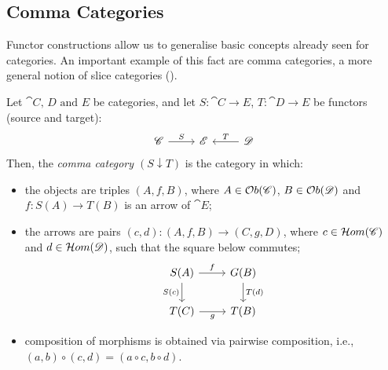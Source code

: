 \subsection{Comma Categories}

Functor constructions allow us to generalise basic concepts already seen for categories. An important example of this fact are comma categories, a more general notion of slice categories ().


\begin{definition}\label{def:comma_category}
    Let $\cat{C \text{, } D \text{ and } E}$ be categories, and let $S: \cat{C \rightarrow E}$, $T:\cat{D \rightarrow E}$ be functors (source and target):
    \[
        \begin{tikzcd}
            \cat{C} \arrow[r, "S"] & \cat{E} & \cat{D} \arrow[l, "T" swap]
        \end{tikzcd}
    \]
    Then, the \emph{comma category $(S \downarrow T)$} is the category in which: 
    \begin{itemize}
        \item the objects are triples $(A, f, B)$, where $A \in \mathcal{O}b(\mathscr{C})$, $B \in \mathcal{O}b(\mathscr{D})$ and $f: S(A) \rightarrow T(B)$ is an arrow of $\cat E$;
        \item the arrows are pairs $(c, d): (A, f, B) \rightarrow (C, g, D)$, where $c \in \mathcal{H}om(\mathscr{C})$ and $d \in \mathcal{H}om(\mathscr{D})$, such that the square below commutes;
        \[
            \begin{tikzcd}
            S(A) \arrow[r, "f"] \arrow[d, "S(c)" swap] & G(B) \arrow[d, "T(d)"] \\
            T(C) \arrow[r, "g" swap] & T(B)
            \end{tikzcd}
        \]
        \item composition of morphisms is obtained via pairwise composition, i.e., $(a, b) \circ (c, d) = (a \circ c, b \circ d)$.
    \end{itemize}
\end{definition}

